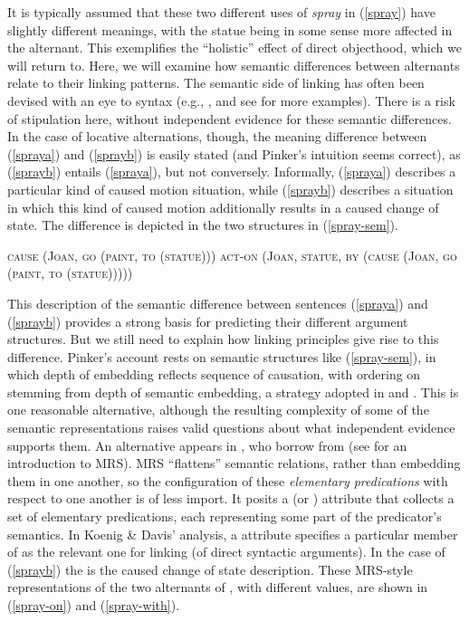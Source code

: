 \documentclass[output=paper
                ,modfonts
                ,nonflat
	        ,collection
	        ,collectionchapter
	        ,collectiontoclongg
 	        ,biblatex
                ,babelshorthands
                ,newtxmath
                ,draftmode
                ,colorlinks, citecolor=brown
]{./langsci/langscibook}
\begin{document}
It is typically assumed that these two different uses of \textit{spray} in (\ref{spray}) have slightly different meanings, with the statue being in some sense more affected in the  alternant.
This exemplifies the ``holistic'' effect of direct objecthood,  which we will return to.
Here, we will examine how semantic differences between alternants relate to their linking patterns.
The semantic side of linking has often been devised with an eye to syntax (e.g., \citealt{Pinker1989}, and see \citealt{KoenigandDavis2006} for more examples).
There is a risk of stipulation here, without independent evidence for these semantic differences.
In the case of locative alternations, though, the meaning difference between (\ref{spraya}) and (\ref{sprayb}) is easily stated (and Pinker's intuition seems correct), as (\ref{sprayb}) entails (\ref{spraya}), but not conversely.
Informally, (\ref{spraya}) describes a particular kind of caused motion situation, while  (\ref{sprayb}) describes a situation in which this kind of caused motion additionally results in a caused change of state.
The difference is depicted in the two structures in (\ref{spray-sem}).

\begin{exe}\ex\label{spray-sem}
\begin{xlist}
\ex \label{spray-sema} \textsc{cause (Joan, go (paint, to (statue)))}
\ex \label{spray-semb} \textsc{act-on (Joan, statue, by (cause (Joan, go (paint, to (statue)))))}
\end{xlist}
\end{exe}

This description of the semantic difference between sentences (\ref{spraya}) and (\ref{sprayb}) provides a strong basis for predicting their different argument structures.
But we still need to explain how linking principles give rise to this difference.
Pinker's account rests on semantic structures like (\ref{spray-sem}), in which depth of embedding reflects sequence of causation, with ordering on \argst stemming from depth of semantic embedding, a strategy adopted in \citet{Davis1996} and \citet{Davis2001}.
This is one reasonable alternative, although the resulting complexity of some of the semantic representations raises valid questions about what independent evidence supports them.
An alternative appears in \citet{KoenigandDavis2006}, who borrow from  (see  for an introduction to MRS).
MRS ``flattens'' semantic relations, rather than embedding them in one another, so the configuration of these \emph{elementary predications}  with respect to one another is of less import.
It posits a  (or \rels)  attribute that collects a set of elementary predications, each representing some part of the predicator's semantics.
In Koenig \& Davis' analysis, a  attribute specifies a particular member of \rels as the relevant one for linking (of direct syntactic arguments). 
In the case of (\ref{sprayb}) the  is the caused change of state description.
These MRS-style representations of the two alternants of , with different  values, are shown in (\ref{spray-on}) and (\ref{spray-with}).
\end{document}
